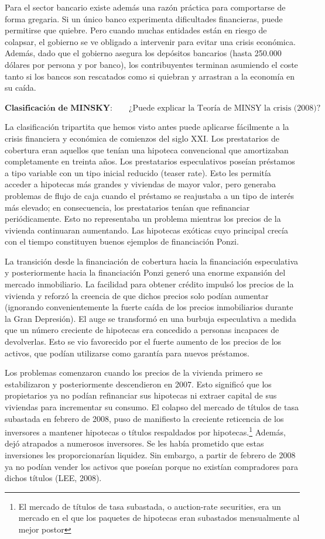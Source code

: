 \documentclass[10pt,a4paper]{article}
\begin{document}
Para el sector bancario existe además una razón práctica para comportarse de forma gregaria. Si un único banco experimenta dificultades financieras, puede permitirse que quiebre. Pero cuando muchas entidades están en riesgo de colapsar, el gobierno se ve obligado a intervenir para evitar una crisis económica. Además, dado que el gobierno asegura los depósitos bancarios (hasta 250.000 dólares por persona y por banco), los contribuyentes terminan asumiendo el coste tanto si los bancos son rescatados como si quiebran y arrastran a la economía en su caída.

$\textbf{Clasificación de MINSKY}: \qquad \text{¿Puede explicar la Teoría de MINSY la crisis (2008)?}$

La clasificación tripartita que hemos visto antes puede aplicarse fácilmente a la crisis financiera y económica de comienzos del siglo XXI. Los prestatarios de cobertura eran aquellos que tenían una hipoteca convencional que amortizaban completamente en treinta años. Los prestatarios especulativos poseían préstamos a tipo variable con un tipo inicial reducido (teaser rate). Esto les permitía acceder a hipotecas más grandes y viviendas de mayor valor, pero generaba problemas de flujo de caja cuando el préstamo se reajustaba a un tipo de interés más elevado; en consecuencia, los prestatarios tenían que refinanciar periódicamente. Esto no representaba un problema mientras los precios de la vivienda continuaran aumentando. Las hipotecas exóticas cuyo principal crecía con el tiempo constituyen buenos ejemplos de financiación Ponzi.

La transición desde la financiación de cobertura hacia la financiación especulativa y posteriormente hacia la financiación Ponzi generó una enorme expansión del mercado inmobiliario. La facilidad para obtener crédito impulsó los precios de la vivienda y reforzó la creencia de que dichos precios solo podían aumentar (ignorando convenientemente la fuerte caída de los precios inmobiliarios durante la Gran Depresión). El auge se transformó en una burbuja especulativa a medida que un número creciente de hipotecas era concedido a personas incapaces de devolverlas. Esto se vio favorecido por el fuerte aumento de los precios de los activos, que podían utilizarse como garantía para nuevos préstamos.
 
Los problemas comenzaron cuando los precios de la vivienda primero se estabilizaron y posteriormente descendieron en 2007. Esto significó que los propietarios ya no podían refinanciar sus hipotecas ni extraer capital de sus viviendas para incrementar su consumo. El colapso del mercado de títulos de tasa subastada en febrero de 2008, puso de manifiesto la creciente reticencia de los inversores a mantener hipotecas o títulos respaldados por hipotecas.\footnote{%
    El mercado de títulos de tasa subastada, o auction-rate securities, era un mercado en el que los paquetes de hipotecas eran subastados mensualmente al mejor postor
} Además, dejó atrapados a numerosos inversores. Se les había prometido que estas inversiones les proporcionarían liquidez. Sin embargo, a partir de febrero de 2008 ya no podían vender los activos que poseían porque no existían compradores para dichos títulos (LEE, 2008).
\end{document}
